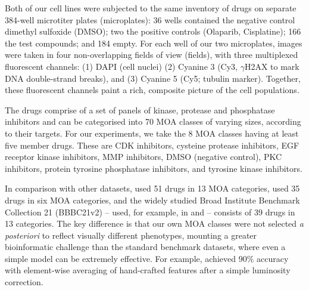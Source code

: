 Both of our cell lines were subjected to the same inventory of drugs on separate 384-well microtiter plates (microplates): 36 wells contained the negative control dimethyl sulfoxide (DMSO); two the positive controls (Olaparib, Cisplatine); 166 the test compounds; and 184 empty. For each well of our two microplates, images were taken in four non-overlapping fields of view (fields), with three multiplexed fluorescent channels: (1) DAPI (cell nuclei) (2) Cyanine 3 (Cy3, $\gamma$H2AX to mark DNA double-strand breaks), and (3) Cyanine 5 (Cy5; tubulin marker). Together, these fluorescent channels paint a rich, composite picture of the cell populations.

The drugs comprise of a set of panels of kinase, protease and phosphatase inhibitors and can be categorised into 70 MOA classes of varying sizes, according to their targets. For our experiments, we take the 8 MOA classes having at least five member drugs. These are CDK inhibitors, cysteine protease inhibitors, EGF receptor kinase inhibitors, MMP inhibitors, DMSO (negative control), PKC inhibitors, protein tyrosine phosphatase inhibitors, and tyrosine kinase inhibitors.

In comparison with other datasets, \cite{adams2006compound} used 51 drugs in 13 MOA categories, \cite{slack2008characterizing} used 35 drugs in six MOA categories, and the widely studied Broad Institute Benchmark Collection 21 (BBBC21v2) \cite{ljosa2012annotated} -- used, for example, in \cite{kandaswamy2016high} and \cite{godinez2017multi} -- consists of 39 drugs in 13 categories. The key difference is that our own MOA classes were not selected \emph{a posteriori} to reflect visually different phenotypes, mounting a greater bioinformatic challenge than the standard benchmark datasets, where even a simple model can be extremely effective. For example, \cite{singh2014pipeline} achieved $90\%$ accuracy with element-wise averaging of hand-crafted features after a simple luminosity correction.


